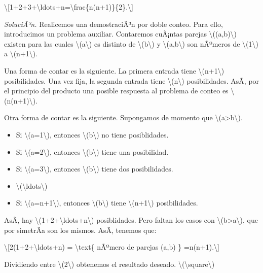 \documentclass[
]{article}
\begin{document}
\textbackslash{[}1+2+3+\textbackslash ldots+n=\textbackslash frac\{n(n+1)\}\{2\}.\textbackslash{]}

\emph{SoluciÃ³n.} Realicemos una demostraciÃ³n por doble conteo. Para
ello, introducimos un problema auxiliar. Contaremos cuÃ¡ntas parejas
{\textbackslash((a,b)\textbackslash)} existen para las cuales
{\textbackslash(a\textbackslash)} es distinto de
{\textbackslash(b\textbackslash)} y {\textbackslash(a,b\textbackslash)}
son nÃºmeros de {\textbackslash(1\textbackslash)} a
{\textbackslash(n+1\textbackslash)}.

Una forma de contar es la siguiente. La primera entrada tiene
{\textbackslash(n+1\textbackslash)} posibilidades. Una vez fija, la
segunda entrada tiene {\textbackslash(n\textbackslash)} posibilidades.
AsÃ­, por el principio del producto una posible respuesta al problema de
conteo es {\textbackslash(n(n+1)\textbackslash)}.

Otra forma de contar es la siguiente. Supongamos de momento que
{\textbackslash(a\textgreater b\textbackslash)}.

\begin{itemize}
\item
  Si {\textbackslash(a=1\textbackslash)}, entonces
  {\textbackslash(b\textbackslash)} no tiene posiblidades.
\item
  Si {\textbackslash(a=2\textbackslash)}, entonces
  {\textbackslash(b\textbackslash)} tiene una posibilidad.
\item
  Si {\textbackslash(a=3\textbackslash)}, entonces
  {\textbackslash(b\textbackslash)} tiene dos posibilidades.
\item
  {\textbackslash(\textbackslash ldots\textbackslash)}
\item
  Si {\textbackslash(a=n+1\textbackslash)}, entonces
  {\textbackslash(b\textbackslash)} tiene
  {\textbackslash(n+1\textbackslash)} posibilidades.
\end{itemize}

AsÃ­, hay {\textbackslash(1+2+\textbackslash ldots+n\textbackslash)}
posiblidades. Pero faltan los casos con
{\textbackslash(b\textgreater a\textbackslash)}, que por simetrÃ­a son
los mismos. AsÃ­, tenemos que:

\textbackslash{[}2(1+2+\textbackslash ldots+n) = \textbackslash text\{
nÃºmero de parejas (a,b) \} =n(n+1).\textbackslash{]}

Dividiendo entre {\textbackslash(2\textbackslash)} obtenemos el
resultado deseado.
{{\textbackslash(\textbackslash square\textbackslash)}}
\end{document}
